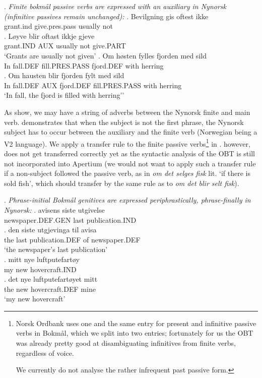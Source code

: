 \documentclass[11pt]{article}
\begin{document}
\setlength{\Exlabelsep}{1.1em} %
\alignSubExtrue %
\ex. \label{pass} \emph{Finite bokmål passive verbs are expressed with an auxiliary
  in Nynorsk (infinitive passives remain unchanged):}
\ag. Bevilgning gis oftest ikke\\
grant.{\sc ind} give.{\sc pres.pass} usually not\\
\bg. Løyve blir oftast ikkje gjeve\\
grant.IND AUX usually not give.PART \\
`Grants are usually not given'
\cg. Om høsten fylles fjorden med sild\\
In fall.DEF fill.PRES.PASS fjord.DEF with herring\\
\label{pass-syntax}
\dg. Om hausten blir fjorden fylt med sild\\
In fall.DEF AUX fjord.DEF fill.PRES.PASS with herring\\ 
`In fall, the fjord is filled with herring''

As \Last[a-b] show, we may have a string of adverbs between the
Nynorsk finite and main verb. \Last[c-d] demonstrates that when the
subject is not the first phrase, the Nynorsk subject has to occur
between the auxiliary and the finite verb (Norwegian being a V2
language). We apply a transfer rule to the finite passive
verbs\footnote{Norsk Ordbank uses
  one and the same entry for present and infinitive passive verbs in
  Bokmål, which we split into two entries; fortunately for us the
  OBT was already pretty good at disambiguating
  infinitives from finite verbs, regardless of voice. 

We currently
  do not analyse the
  rather infrequent past passive form.} in \Last[a-b]. \Last[c-d]
however, does not get transferred correctly yet as the syntactic
analysis of the OBT is still not incorporated into
Apertium (we would not want to apply such a transfer rule if a
non-subject followed the passive verb, as in \emph{om det selges fisk}
lit. `if there is sold fish', which should transfer by the same rule
as \Last[a-b] to \emph{om det
  blir selt fisk}).

\ex. \label{posgen} \emph{Phrase-initial Bokmål genitives are expressed
  periphrastically, phrase-finally in Nynorsk:}
\ag. avisens siste utgivelse\\
newspaper.DEF.GEN last publication.IND\\
\bg. den siste utgjevinga til avisa\\
the last publication.DEF of newspaper.DEF\\
`the newspaper's last publication'\\
\cg. mitt nye luftputefartøy\\
my new hovercraft.IND\\
\dg. det nye luftputefartøyet mitt\\
the new hovercraft.DEF mine\\
`my new hovercraft'
\end{document}

